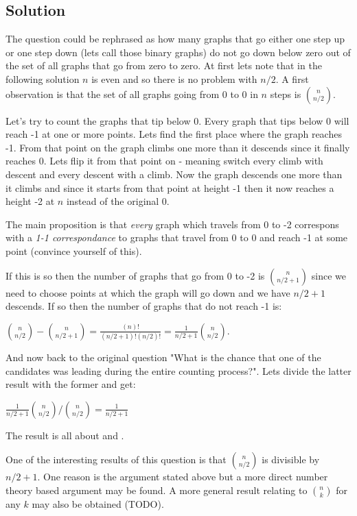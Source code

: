 \documentclass{article}
\begin{document}
\subsection{Solution}
The question could be rephrased as how many graphs that go either one step up or one step down (lets call those binary graphs) do not go down below zero out of the set of all graphs that go from zero to zero. At first lets note that in the following solution $n$ is even and so there is no problem with $n/2$. A first observation is that the set of all graphs going from 0 to 0 in $n$ steps is ${n \choose n/2}$.

Let's try to count the graphs that tip below 0. Every graph that tips below 0 will reach -1 at one or more points. Lets find the first place where the graph reaches -1. From that point on the graph climbs one more than it descends since it finally reaches 0. Lets flip it from that point on - meaning switch every climb with descent and every descent with a climb. Now the graph descends one more than it climbs and since it starts from that point at height -1 then it now reaches a height -2 at $n$ instead of the original 0.

The main proposition is that \emph{every} graph which travels from 0 to -2 correspons with a \emph{1-1 correspondance} to graphs that travel from 0 to 0 and reach -1 at some point (convince yourself
of this).

If this is so then the number of graphs that go from 0 to -2 is ${n \choose n/2+1}$ since we need to
choose points at which the graph will go down and we have $n/2+1$ descends. If so then the number of
graphs that do not reach -1 is:

${n \choose n/2} - {n \choose n/2+1} = \frac{(n)!}{(n/2+1)!(n/2)!} = \frac{1}{n/2+1}{n \choose n/2}$.

And now back to the original question "What is the chance that one of the candidates was leading during the entire counting process?". Lets divide the latter result with the former and get:

$\frac{1}{n/2+1}{n \choose n/2} / {n \choose n/2} = \frac{1}{n/2+1}$

The result is all about 
and .

One of the interesting results of this question is that ${n \choose n/2}$ is divisible by $n/2+1$. One reason
is the argument stated above but a more direct number theory based argument may be found. A more general result
relating to ${n \choose k}$ for any $k$ may also be obtained (TODO).
\end{document}
